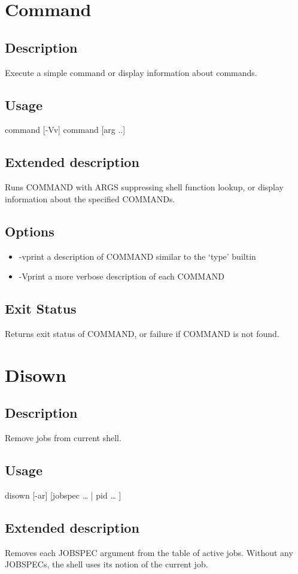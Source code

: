 \documentclass[12pt,a4paper]{report}
\begin{document}
\chapter{Command}
\section{Description}
Execute a simple command or display information about commands.
\section{Usage}
command [-Vv] command [arg ..]
\section{Extended description}
Runs COMMAND with ARGS suppressing  shell function lookup, or display information about the specified COMMANDs.
\section{Options}
\begin{itemize}
	\item -v\hspace{7 mm}print a description of COMMAND similar to the `type' builtin
	\item -V\hspace{7 mm}print a more verbose description of each COMMAND
\end{itemize}
\section{Exit Status}
Returns exit status of COMMAND, or failure if COMMAND is not found.
\newpage

\chapter{Disown}
\section{Description}
Remove jobs from current shell.
\section{Usage}
disown [-ar] [jobspec … | pid … ]
\section{Extended description}
Removes each JOBSPEC argument from the table of active jobs. Without any JOBSPECs, the shell uses its notion of the current job.
\end{document}
